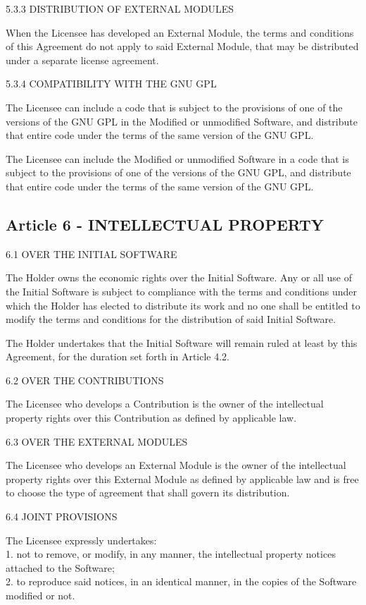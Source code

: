 5.3.3 DISTRIBUTION OF EXTERNAL MODULES

When the Licensee has developed an External Module, the terms and conditions of this Agreement do not apply to said External Module, that may be distributed under a separate license agreement.

5.3.4 COMPATIBILITY WITH THE GNU GPL

The Licensee can include a code that is subject to the provisions of one of the versions of the GNU GPL in the Modified or unmodified Software, and distribute that entire code under the terms of the same version of the GNU GPL.

The Licensee can include the Modified or unmodified Software in a code that is subject to the provisions of one of the versions of the GNU GPL, and distribute that entire code under the terms of the same version of the GNU GPL.

\subsection*{Article 6 - INTELLECTUAL PROPERTY}

6.1 OVER THE INITIAL SOFTWARE

The Holder owns the economic rights over the Initial Software. Any or all use of the Initial Software is subject to compliance with the terms and conditions under which the Holder has elected to distribute its work and no one shall be entitled to modify the terms and conditions for the distribution of said Initial Software.

The Holder undertakes that the Initial Software will remain ruled at least by this Agreement, for the duration set forth in Article 4.2.

6.2 OVER THE CONTRIBUTIONS

The Licensee who develops a Contribution is the owner of the intellectual property rights over this Contribution as defined by applicable law.

6.3 OVER THE EXTERNAL MODULES

The Licensee who develops an External Module is the owner of the intellectual property rights over this External Module as defined by applicable law and is free to choose the type of agreement that shall govern its distribution.

6.4 JOINT PROVISIONS

The Licensee expressly undertakes: \\
1. not to remove, or modify, in any manner, the intellectual property notices attached to the Software; \\
2. to reproduce said notices, in an identical manner, in the copies of the Software modified or not.

